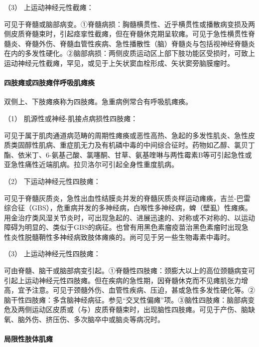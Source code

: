 \hypertarget{text00018.htmlux5cux23CHP1-6-2-3-7-3}{}
（3） 上运动神经元性截瘫：

可见于脊髓或脑部病变。①脊髓病损：胸髓横贯性、近乎横贯性或播散病变损及两侧皮质脊髓束时，引起痉挛性截瘫，但在脊髓休克期呈软瘫。可见于急性横贯性脊髓炎、脊髓外伤、脊髓血管性疾病、急性播散性（脑）脊髓炎与包括视神经脊髓炎在内的多发性硬化。②脑部病损：两侧皮质运动区上部下肢功能区受损时，可致上运动神经元性截瘫，罕见，或见于上矢状窦血栓形成、矢状窦旁脑膜瘤时。

\paragraph{四肢瘫或四肢瘫伴呼吸肌瘫痪}

双侧上、下肢瘫痪称为四肢瘫。急重病例常合有呼吸肌瘫痪。

\hypertarget{text00018.htmlux5cux23CHP1-6-2-3-8-1}{}
（1） 肌源性或神经-肌接点病损性四肢瘫：

可见于属于肌肉通道病范畴的周期性瘫痪或恶性高热、急起的多发性肌炎、急性皮质类固醇性肌病、重症肌无力及有机磷中毒的中间综合征时。药物如乙醇、氯贝丁酯、依米丁、6-氨基己酸、氯噻酮、甘草、氨基喹啉与两性霉素B等可引起急性或亚急性痛性近端肌病。拉贝洛尔可引起全身性重度肌病。

\hypertarget{text00018.htmlux5cux23CHP1-6-2-3-8-2}{}
（2） 下运动神经元性四肢瘫：

可见于脊髓灰质炎，急性出血性结膜炎并发的脊髓灰质炎样运动瘫痪，吉兰-巴雷综合征（GBS），危重病并发的多神经病，白喉性多神经病，蜱（壁虱）性瘫痪。用金治疗类风湿关节炎时，可出现急起的、进展迅速的、对称或不对称的、以运动障碍为明显的、类似于GBS的病征。也曾有用黑色素瘤疫苗治黑色素瘤时出现急性炎性脱髓鞘性多神经病致肢体瘫痪的。尚可见于另一些生物毒素中毒时。

\hypertarget{text00018.htmlux5cux23CHP1-6-2-3-8-3}{}
（3） 上运动神经元性四肢瘫：

可由脊髓、脑干或脑部病变引起。①脊髓性四肢瘫：颈膨大以上的高位颈髓病变可引起上运动神经元性四肢瘫。但在疾病的急性期，因脊髓休克而不见瘫肌张力增高，宜予注意。可见于颈髓外伤、血管性疾病、压迫，甚或急性多发性硬化等。②脑干性四肢瘫：多含脑神经病征。参见“交叉性偏瘫”项。③脑性四肢瘫：脑部病变危及两侧运动区皮质或（与）皮质脊髓束时，出现脑性四肢瘫。可见于产伤、脑缺氧、脑外伤、挤压伤、多次脑卒中或脑炎等病况时。

\paragraph{局限性肢体肌瘫}

